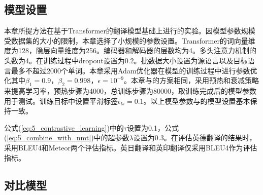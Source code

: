 \subsection{模型设置}
\label{sec:5_model_setup}

本章所提方法在基于Transformer的翻译模型基础上进行的实验。因模型参数规模受数据集的大小的限制，本章选择了小规模的参数设置。Transformer的词向量维度为128，隐层向量维度为256。编码器和解码器的层数均为4。多头注意力机制的头数为4。在训练过程中dropout设置为0.2。批数据大小设置为源语言以及目标语言最多不超过2000个单词。本章采用Adam优化器在模型的训练过程中进行参数优化其中$\beta_1=0.9$，$\beta_2=0.998$，$\epsilon=10^{-9}$。本章与的方案相同，采用预热和衰减策略来提高学习率，预热步骤为4000，总训练步骤为80000，取训练完成后的模型参数用于测试。训练目标中设置平滑标签$\epsilon_{ls}=0.1$。以上模型参数与的模型设置基本保持一致。

公式(\ref{eq:5_contrastive_learning})中的$\tau$设置为0.1，公式(\ref{eq:5_combine_with_nmt})中的超参数$\lambda$设置为0.3。在评估英德翻译的结果时，采用BLEU4和Meteor两个评估指标。英日翻译和英印翻译仅采用BLEU4作为评估指标。

\subsection{对比模型}

